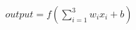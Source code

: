 \documentclass[preview]{standalone}
\begin{document}
\begin{align*}
output = f(\sum_{i=1}^{3} w_i x_i + b)
\end{align*}
\end{document}
